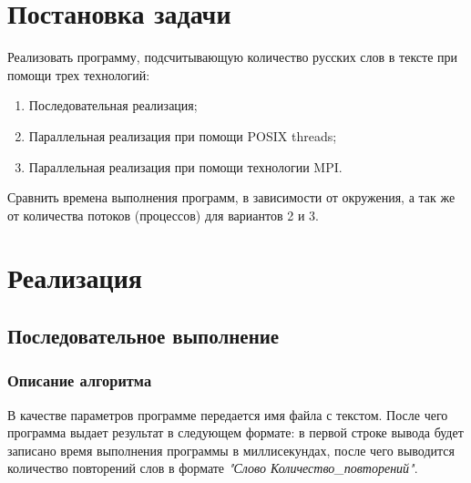 \documentclass[12pt,a4paper]{report}
\begin{document}
	
	
	\renewcommand{\thesection}{\arabic{section}}
	\tableofcontents
	\pagebreak
	
	\setcounter{totalnumber}{10}
	\setcounter{topnumber}{10}
	\setcounter{bottomnumber}{10}
	\renewcommand{\topfraction}{1}
	\renewcommand{\textfraction}{0}
	
	\section{Постановка задачи}
		Реализовать программу, подсчитывающую количество русских слов в тексте при помощи трех технологий:
		\begin{enumerate}
			\item Последовательная реализация;
			\item Параллельная реализация при помощи POSIX threads;
			\item Параллельная реализация при помощи технологии MPI.
		\end{enumerate}
		Сравнить времена выполнения программ, в зависимости от окружения, а так же от количества потоков (процессов) для вариантов 2 и 3.
	\section{Реализация}
		\subsection{Последовательное выполнение}
			\subsubsection{Описание алгоритма}
				В качестве параметров программе передается имя файла с текстом. После чего программа выдает результат в следующем формате: в первой строке вывода будет записано время выполнения программы в миллисекундах, после чего выводится количество повторений слов в формате \textit{"Слово Количество\_повторений"}.
				
\end{document}
